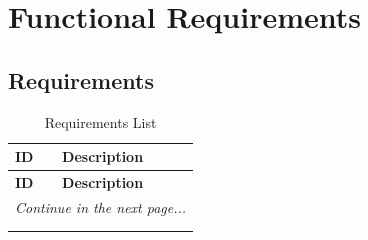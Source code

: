 \section{Functional Requirements}
\subsection{Requirements}

\begin{longtable}{|l|p{14cm}|} 
    \hline
    \textbf{ID} & \textbf{Description} \\ \hline
    \endfirsthead

    \hline
    \textbf{ID} & \textbf{Description} \\ \hline
    \endhead

    \hline
    \multicolumn{2}{r}{\textit{Continue in the next page...}} \\
    \endfoot

    \caption{Requirements List} \\
    \hline
    \endlastfoot


\end{longtable}
